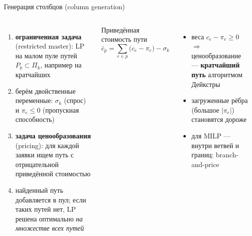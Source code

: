 \documentclass[aspectratio=169,10pt]{beamer}
\begin{document}
\begin{frame}{Генерация столбцов (column generation)}
\begin{columns}[T]
\begin{enumerate}\setlength{\itemsep}{4pt}
\item \textbf{ограниченная задача} (restricted master): LP на малом пуле путей $P_k\subset\Pi_k$, например на кратчайших
\item берём двойственные переменные: $\sigma_k$ (спрос) и $\pi_e\le0$ (пропускная способность)
\item \textbf{задача ценообразования} (pricing): для каждой заявки ищем путь с отрицательной приведённой стоимостью
\item найденный путь добавляется в пул; если таких путей нет, LP решена оптимально \emph{на множестве всех путей}
\end{enumerate}
\begin{block}{Приведённая стоимость пути}
\[
\bar c_p=\sum_{e\in p}\bigl(c_e-\pi_e\bigr)-\sigma_k
\]
\end{block}
\begin{itemize}
\item веса $c_e-\pi_e\ge0$ $\Rightarrow$ ценообразование --- \textbf{кратчайший путь} алгоритмом Дейкстры
\item загруженные рёбра (большое $|\pi_e|$) становятся дороже
\item для MILP --- внутри ветвей и границ: branch-and-price
\end{itemize}
\end{columns}
\end{frame}
\end{document}
